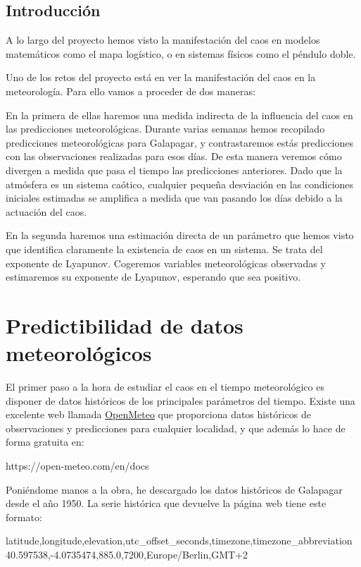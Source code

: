 \documentclass[
  10pt,
  a4paper,
  DIV=11,
  numbers=noendperiod,
  open=any]{scrreprt}
\numberwithin{equation}{chapter}
\numberwithin{equation}{section}
\renewcommand{\[}{\begin{equation}}
\renewcommand{\]}{\end{equation}}
\begin{document}
\section{Introducción}\label{introducciuxf3n-5}

A lo largo del proyecto hemos visto la manifestación del caos en modelos
matemáticos como el mapa logístico, o en sistemas físicos como el
péndulo doble.

Uno de los retos del proyecto está en ver la manifestación del caos en
la meteorología. Para ello vamos a proceder de dos maneras:

En la primera de ellas haremos una medida indirecta de la influencia del
caos en las predicciones meteorológicas. Durante varias semanas hemos
recopilado predicciones meteorológicas para Galapagar, y contrastaremos
estás predicciones con las observaciones realizadas para esos días. De
esta manera veremos cómo divergen a medida que pasa el tiempo las
predicciones anteriores. Dado que la atmósfera es un sistema caótico,
cualquier pequeña desviación en las condiciones iniciales estimadas se
amplifica a medida que van pasando los días debido a la actuación del
caos.

En la segunda haremos una estimación directa de un parámetro que hemos
visto que identifica claramente la existencia de caos en un sistema. Se
trata del exponente de Lyapunov. Cogeremos variables meteorológicas
observadas y estimaremos su exponente de Lyapunov, esperando que sea
positivo.

\chapter{Predictibilidad de datos
meteorológicos}\label{predictibilidad-de-datos-meteoroluxf3gicos}

El primer paso a la hora de estudiar el caos en el tiempo meteorológico
es disponer de datos históricos de los principales parámetros del
tiempo. Existe una excelente web llamada
\href{https://open-meteo.com/en/docs}{OpenMeteo} que proporciona datos
históricos de observaciones y predicciones para cualquier localidad, y
que además lo hace de forma gratuita en:

https://open-meteo.com/en/docs

Poniéndome manos a la obra, he descargado los datos históricos de
Galapagar desde el año 1950. La serie histórica que devuelve la página
web tiene este formato:

latitude,longitude,elevation,utc\_offset\_seconds,timezone,timezone\_abbreviation\\
40.597538,-4.0735474,885.0,7200,Europe/Berlin,GMT+2
\end{document}
